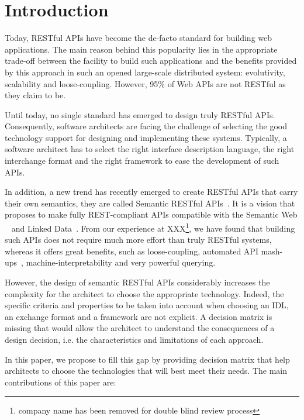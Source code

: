 \section{Introduction}

Today, RESTful APIs \cite{FieldingThesis} have become the de-facto standard for building web applications. The main reason behind this popularity lies in the appropriate trade-off between the facility to build such applications and the benefits provided by this approach in such an opened large-scale distributed system: evolutivity, scalability and loose-coupling. However, 95\% of Web APIs are not RESTful \cite{10.1007/978-3-319-38791-8_2} as they claim to be.

Until today, no single standard has emerged to design truly RESTful APIs. Consequently, software architects are facing the challenge of selecting the good technology support for designing and implementing these systems. Typically, a software architect has to select the right interface description language, the right  interchange format and the right framework to ease the development of such APIs.

In addition, a new trend has recently emerged to create RESTful APIs that carry their own semantics, they are called Semantic RESTful APIs~\cite{7195633}. It is a vision that proposes to make fully REST-compliant APIs compatible with the Semantic Web ~\cite{TheSemanticWeb} and Linked Data~\cite{LinkedDataPrinciples}. From our experience at XXX\footnote{company name has been removed for double blind review process}, we have found that building such APIs does not require much more effort than truly RESTful systems, whereas it offers great benefits, such as loose-coupling, automated API mash-ups~\cite{benslimane2008services}, machine-interpretability and very powerful querying. 

However, the design of semantic RESTful APIs considerably increases the complexity for the architect to choose the appropriate technology. Indeed, the specific criteria and properties to be taken into account when choosing an IDL, an exchange format and a framework are not explicit. A decision matrix is missing that would allow the architect to understand the consequences of a design decision, i.e. the characteristics and limitations of each approach.
 
In this paper, we propose to fill this gap by providing decision matrix that help architects to choose the technologies that will best meet their needs. The main contributions of this paper are:


